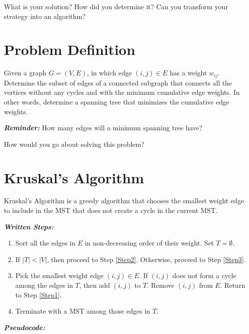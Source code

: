 \documentclass[12pt]{article}
\theoremstyle{definition}
\begin{document}
\vfill

What is your solution? How did you determine it? Can you transform your strategy into an algorithm?

\vfill


\newpage
\section{Problem Definition}

Given a graph $G = (V,E)$, in which edge $(i,j) \in E$ has a weight $w_{ij}$. Determine the subset of edges of a connected subgraph that connects all the vertices without any cycles and with the minimum cumulative edge weights. In other words, determine a spanning tree that minimizes the cumulative edge weights.

\textbf{\emph{Reminder:}} How many edges will a minimum spanning tree have?


\vfill

How would you go about solving this problem?

\vfill

\newpage

\section{Kruskal's Algorithm}

Kruskal's Algorithm is a greedy algorithm that chooses the smallest weight edge to include in the MST that does not create a cycle in the current MST.

\emph{\textbf{Written Steps:}}

\begin{enumerate}
	\item Sort all the edges in $E$ in non-decreasing order of their weight. Set $T = \emptyset$. \label{Step0}
	\item If $|T| < |V|$, then proceed to Step \ref{Step2}. Otherwise, proceed to Step \ref{Step3}. \label{Step1}
	\item Pick the smallest weight edge $(i,j) \in E$. If $(i,j)$ does not form a cycle among the edges in $T$, then add $(i,j)$ to $T$. Remove $(i,j)$ from $E$. Return to Step \ref{Step1}. \label{Step2}
	\item Terminate with a MST among those edges in $T$. \label{Step3}
\end{enumerate}


\emph{\textbf{Pseudocode:}}
\end{document}
